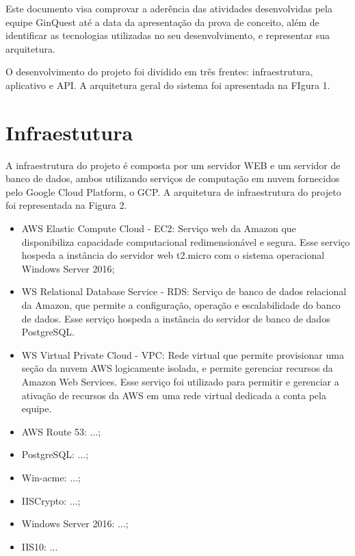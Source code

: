 \documentclass[
    12pt,               %
    openright,          %
    twoside,            %
    a4paper,            %
    openany             %
    draft,              %
    MODELO,             %
    TODO,               %
    english,            %
    brazil              %
    ]{ifsp-spo-inf-ctds}
\begin{document}
\frenchspacing 

\pretextual

\imprimirfolhaderosto

\textual

Este documento visa comprovar a aderência das atividades desenvolvidas  pela equipe GinQuest até a data da apresentação da prova de conceito, além de identificar as tecnologias utilizadas no seu desenvolvimento, e  representar sua arquitetura.

O desenvolvimento do projeto foi dividido em três frentes: infraestrutura, aplicativo e API. A arquitetura geral do sistema foi apresentada na FIgura 1.

\vspace{1cm}

\begingroup
\let\clearpage\relax
\chapter{Infraestutura}
\endgroup

A infraestrutura do projeto é composta por um servidor WEB e um servidor de banco de dados, ambos utilizando serviços de computação em nuvem fornecidos pelo Google Cloud Platform, o GCP. A arquitetura de infraestrutura do projeto foi representada na Figura 2.


\begin{itemize}
\item AWS Elastic Compute Cloud - EC2: Serviço web da Amazon que disponibiliza capacidade computacional redimensionável e segura. Esse serviço hospeda a instância do servidor web t2.micro com o sistema operacional Windows Server 2016;
\item WS Relational Database Service - RDS: Serviço de banco de dados relacional da Amazon, que permite a configuração, operação e escalabilidade do banco de dados. Esse serviço hospeda a instância do servidor de banco de dados PostgreSQL.
\item WS Virtual Private Cloud - VPC: Rede virtual que permite provisionar uma seção da nuvem AWS logicamente isolada, e permite gerenciar recursos da Amazon Web Services. Esse serviço foi utilizado para permitir e gerenciar a ativação de recursos da AWS em uma rede virtual dedicada a conta pela equipe.
\item AWS Route 53: ...;
\item PostgreSQL: ...;
\item Win-acme: ...;
\item IISCrypto: ...;
\item Windows Server 2016: ...;
\item IIS10: ...
\end{itemize}
\end{document}
